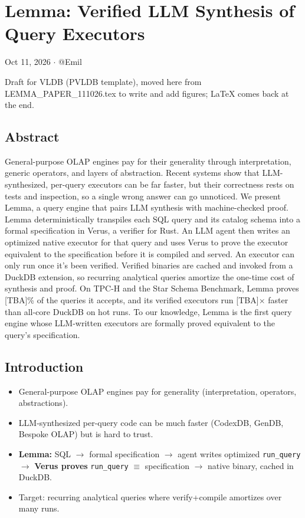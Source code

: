 \documentclass[
  10pt,
]{article}
\author{}
\date{}
\providecommand{\tightlist}{%
  \setlength{\itemsep}{0pt}\setlength{\parskip}{0pt}}
\begin{document}
\section{Lemma: Verified LLM Synthesis of Query
Executors}\label{lemma-verified-llm-synthesis-of-query-executors}

Oct 11, 2026 \ensuremath{\cdot} @Emil

Draft for VLDB (PVLDB template), moved here from
LEMMA\_PAPER\_111026.tex to write and add figures; LaTeX comes back at
the end.

\subsection{Abstract}\label{abstract}

General-purpose OLAP engines pay for their generality through
interpretation, generic operators, and layers of abstraction. Recent
systems show that LLM-synthesized, per-query executors can be far
faster, but their correctness rests on tests and inspection, so a single
wrong answer can go unnoticed. We present Lemma, a query engine that
pairs LLM synthesis with machine-checked proof. Lemma deterministically
transpiles each SQL query and its catalog schema into a formal
specification in Verus, a verifier for Rust. An LLM agent then writes an
optimized native executor for that query and uses Verus to prove the
executor equivalent to the specification before it is compiled and
served. An executor can only run once it's been verified. Verified
binaries are cached and invoked from a DuckDB extension, so recurring
analytical queries amortize the one-time cost of synthesis and proof. On
TPC-H and the Star Schema Benchmark, Lemma proves {[}TBA{]}\% of the
queries it accepts, and its verified executors run {[}TBA{]}\ensuremath{\times} faster
than all-core DuckDB on hot runs. To our knowledge, Lemma is the first
query engine whose LLM-written executors are formally proved equivalent
to the query's specification.

\subsection{Introduction}\label{introduction}

\begin{itemize}
\tightlist
\item
  General-purpose OLAP engines pay for generality (interpretation,
  operators, abstractions).
\item
  LLM-synthesized per-query code can be much faster (CodexDB, GenDB,
  Bespoke OLAP) but is hard to trust.
\item
  \textbf{Lemma:} SQL \ensuremath{\rightarrow} formal specification \ensuremath{\rightarrow} agent writes optimized
  \texttt{run\_query} \ensuremath{\rightarrow} \textbf{Verus proves} \texttt{run\_query} \ensuremath{\equiv}
  specification \ensuremath{\rightarrow} native binary, cached in DuckDB.
\item
  Target: recurring analytical queries where verify+compile amortizes
  over many runs.
\end{itemize}
\end{document}

